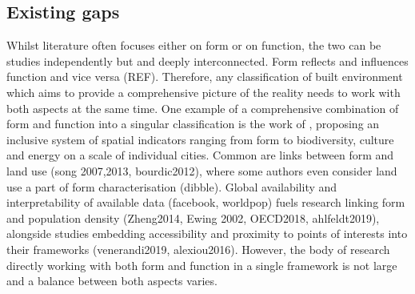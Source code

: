 \subsection{Existing gaps}
\label{sec:lit_gaps}






Whilst literature often focuses either on form or on function, the two can be studies
independently but and deeply interconnected. Form reflects and influences function and
vice versa (REF). Therefore, any classification of built environment which aims to
provide a comprehensive picture of the reality needs to work with both aspects at the
same time. One example of a comprehensive combination of form and function into a
singular classification is the work of \cite{bourdic2012}, proposing an inclusive system
of spatial indicators ranging from form to biodiversity, culture and energy on a scale
of individual cities. Common are links between form and land use (song 2007,2013,
bourdic2012), where some authors even consider land use a part of form characterisation
(dibble). Global availability and interpretability of available data (facebook,
worldpop) fuels research linking form and population density (Zheng2014, Ewing 2002,
OECD2018, ahlfeldt2019), alongside studies embedding accessibility and proximity to
points of interests into their frameworks (venerandi2019, alexiou2016). However, the
body of research directly working with both form and function in a single framework is
not large and a balance between both aspects varies.


